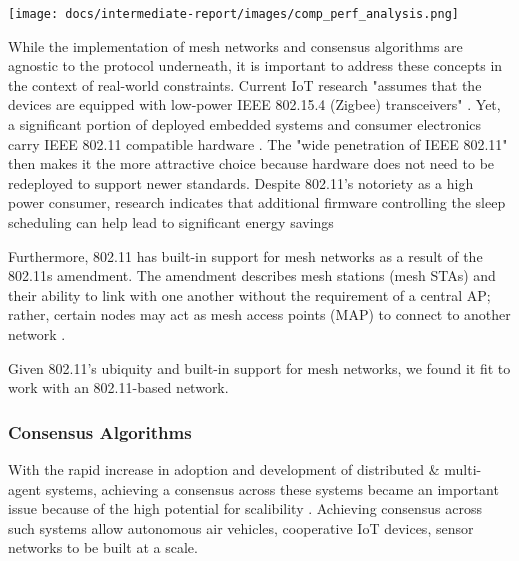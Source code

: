 \documentclass[compsoc]{IEEEtran}
\begin{document}
\begingroup
    \centering
    \medskip
    \texttt{[image: docs/intermediate-report/images/comp\_perf\_analysis.png]}
    \label{fig:comparison_protocols}
\endgroup

While the implementation of mesh networks and consensus algorithms are agnostic to the protocol underneath, it is important to address these concepts in the context of real-world constraints. Current IoT research "assumes that the devices are equipped with low-power IEEE 802.15.4 (Zigbee) transceivers" \cite{disney_glaropoulos2013enhanced}. Yet, a significant portion of deployed embedded systems and consumer electronics carry IEEE 802.11 compatible hardware \cite{disney_glaropoulos2013enhanced}. 
The "wide penetration of IEEE 802.11" \cite{disney_glaropoulos2013enhanced} then makes it the more attractive choice because hardware does not need to be redeployed to support newer standards. Despite 802.11's notoriety as a high power consumer, research indicates that additional firmware controlling the sleep scheduling can help lead to significant energy savings \cite{disney_glaropoulos2013enhanced, barghi2019practicalpower}

Furthermore, 802.11 has built-in support for mesh networks as a result of the 802.11s amendment. The amendment describes mesh stations (mesh STAs) and their ability to link with one another without the requirement of a central AP; rather, certain nodes may act as mesh access points (MAP) to connect to another network \cite{iov_wu2016internet, optical_zeitgeist_laboratory_2011}.

Given 802.11's ubiquity and built-in support for mesh networks, we found it fit to work with an 802.11-based network.

\subsubsection{Consensus Algorithms}
\label{conceptualization_consensus}
With the rapid increase in adoption and development of distributed \& multi-agent systems, achieving a consensus across these systems became an important issue because of the high potential for scalibility \cite{Ge_Han_Ding_Zhang_Ning_2018}. Achieving consensus across such systems allow autonomous air vehicles, cooperative IoT devices, sensor networks to be built at a scale. 
\end{document}
